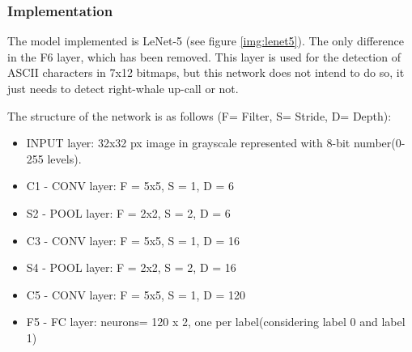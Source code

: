 \documentclass[]{article}
\begin{document}
\subsubsection{Implementation}\label{implementation}

The model implemented is LeNet-5 (see figure \ref{img:lenet5}). The only difference in the F6 layer, which has been removed. This layer is used for the detection of ASCII characters in 7x12 bitmaps, but this network does not intend to do so, it just needs to detect right-whale up-call or not.

The structure of the network is as follows (F= Filter, S= Stride, D= Depth):
\begin{itemize}
	\item INPUT layer: 32x32 px image in grayscale represented with 8-bit number(0-255 levels).
	\item C1 - CONV layer: F = 5x5, S = 1, D = 6
	\item S2 - POOL layer: F = 2x2, S = 2, D = 6
	\item C3 - CONV layer: F = 5x5, S = 1, D = 16
	\item S4 - POOL layer: F = 2x2, S = 2, D = 16
	\item C5 - CONV layer: F = 5x5, S = 1, D = 120
	\item F5 - FC layer: neurons= 120 x 2, one per label(considering label 0 and label 1)
\end{itemize}
\end{document}

